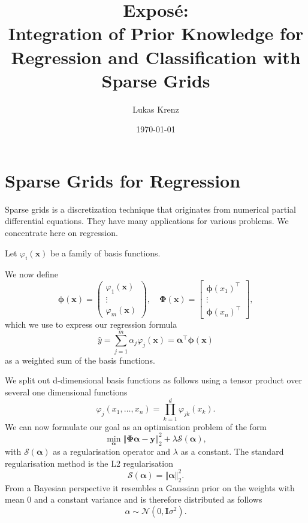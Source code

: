 \documentclass[11pt]{scrartcl}
\author{Lukas Krenz}
\date{\today}
\title{Exposé: \\ Integration of Prior Knowledge for Regression and
  Classification with Sparse Grids }
\begin{document}
\maketitle

\section{Sparse Grids for Regression}
Sparse grids is a discretization technique that originates from numerical partial differential equations.
They have many applications for various problems. We concentrate here on regression.

Let \( \varphi_i(\bm{x})\) be a family of basis functions.

We now define
\begin{equation}
\boldsymbol{\phi}(\boldsymbol{x}) = \begin{pmatrix}
  \varphi_1(\bm{x}) \\
  \vdots \\
  \varphi_m(\bm{x})
\end{pmatrix}
, \quad
\boldsymbol{\Phi}(\boldsymbol{x}) = \begin{bmatrix}
  \boldsymbol{\phi}(x_1)^\intercal\\
  \vdots \\
  \boldsymbol{\phi}(x_n)^\intercal
\end{bmatrix},
\end{equation}
which we use to express our regression formula
\begin{equation}
\hat{y} = \sum_{j = 1}^m \alpha_j \varphi_{j}(\bm{x}) = \boldsymbol{\alpha}^\intercal \bm{\phi} (\bm{x})
\end{equation}
as a weighted sum of the basis functions.

We split out d-dimensional basis functions as follows using a tensor product
over several one dimensional functions
\begin{equation}
\varphi_j (x_1, \ldots, x_n) = \prod_{k=1}^d \varphi_{jk} (x_k).
\end{equation}
We can now formulate our goal as an optimisation problem of the form
\begin{equation}
\min_{\bm{\alpha}} \left\Vert  \bm{\Phi} \bm{\alpha} - \bm{y}   \right\Vert_2^2  + \lambda \mathcal{S}(\bm{\alpha}), 
\end{equation}
with \(\mathcal{S}(\bm{\alpha})\) as a regularisation operator and \(\lambda\) as a constant.
The standard regularisation method is the L2 regularisation 
\begin{equation}
\mathcal{S}(\bm{\alpha}) = \left\Vert \bm{\alpha} \right\Vert_2^2.
\end{equation}
From a Bayesian perspective it resembles a Gaussian prior on the weights with mean 0 and
a constant variance  and is therefore distributed as follows
\begin{equation}
\alpha \sim \mathcal{N} (0, \bm{I} \sigma^2 ).
\end{equation}
\end{document}
